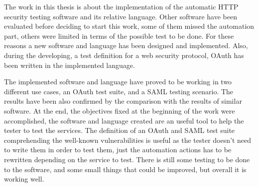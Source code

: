 The work in this thesis is about the implementation of the automatic HTTP security testing software and its relative language. Other software have been evaluated before deciding to start this work, some of them missed the automation part, others were limited in terms of the possible test to be done. For these reasons a new software and language has been designed and implemented. Also, during the developing, a test definition for a web security protocol, \gls{OAuth} has been written in the implemented language.

The implemented software and language have proved to be working in two different use cases, an OAuth test suite, and a SAML testing scenario. The results have been also confirmed by the comparison with the results of similar software. At the end, the objectives fixed at the beginning of the work were accomplished, the software and language created are an useful tool to help the tester to test the services. The definition of an OAuth and SAML test suite comprehending the well-known vulnerabilities is useful as the tester doesn't need to write them in order to test them, just the automation actions has to be rewritten depending on the service to test. There is still some testing to be done to the software, and some small things that could be improved, but overall it is working well.





